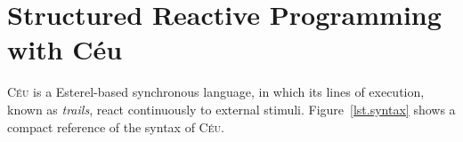 \documentclass{acm_proc_article-sp}
\newcommand{\CEU}{\textsc{C\'{e}u}\xspace}
\newcommand{\1}{\;}
\newcommand{\2}{\;\;}
\newcommand{\3}{\;\;\;}
\newcommand{\5}{\;\;\;\;\;}
\begin{document}

\section{Structured Reactive Programming with C\'eu}
\label{sec.ceu}

\CEU is a Esterel-based synchronous language, in which its lines of execution, 
known as \emph{trails}, react continuously to external stimuli.
%
Figure~\ref{lst.syntax} shows a compact reference of the syntax of \CEU.
\end{document}
